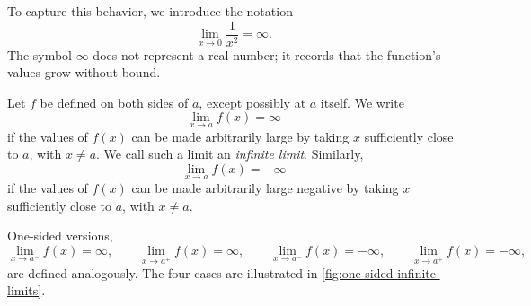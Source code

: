 To capture this behavior, we introduce the notation
\[
\lim_{x \to 0} \frac{1}{x^{2}} = \infty.
\]
The symbol \(\infty\) does not represent a real number; it records that the function's values grow without bound.

\begin{definition}\label{def:infinite-limit-informal}
Let \(f\) be defined on both sides of \(a\), except possibly at \(a\) itself. We write
\[
\lim_{x \to a} f(x) = \infty
\]
if the values of \(f(x)\) can be made arbitrarily large by taking \(x\) sufficiently close to \(a\), with \(x \neq a\). We call such a limit an \emph{infinite limit}. Similarly,
\[
\lim_{x \to a} f(x) = -\infty
\]
if the values of \(f(x)\) can be made arbitrarily large negative by taking \(x\) sufficiently close to \(a\), with \(x \neq a\).
\end{definition}

One-sided versions,
\[
\lim_{x \to a^{-}} f(x) = \infty,\qquad \lim_{x \to a^{+}} f(x) = \infty,\qquad \lim_{x \to a^{-}} f(x) = -\infty,\qquad \lim_{x \to a^{+}} f(x) = -\infty,
\]
are defined analogously. The four cases are illustrated in \cref{fig:one-sided-infinite-limits}.

